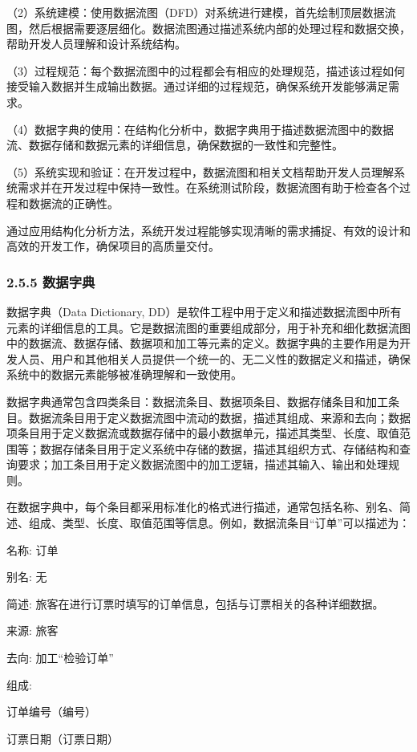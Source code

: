 （2）系统建模：使用数据流图（DFD）对系统进行建模，首先绘制顶层数据流图，然后根据需要逐层细化。数据流图通过描述系统内部的处理过程和数据交换，帮助开发人员理解和设计系统结构。

（3）过程规范：每个数据流图中的过程都会有相应的处理规范，描述该过程如何接受输入数据并生成输出数据。通过详细的过程规范，确保系统开发能够满足需求。

（4）数据字典的使用：在结构化分析中，数据字典用于描述数据流图中的数据流、数据存储和数据元素的详细信息，确保数据的一致性和完整性。

（5）系统实现和验证：在开发过程中，数据流图和相关文档帮助开发人员理解系统需求并在开发过程中保持一致性。在系统测试阶段，数据流图有助于检查各个过程和数据流的正确性。

通过应用结构化分析方法，系统开发过程能够实现清晰的需求捕捉、有效的设计和高效的开发工作，确保项目的高质量交付。

\subsubsection{2.5.5 数据字典}\label{ux6570ux636eux5b57ux5178}

数据字典（Data Dictionary, DD）是软件工程中用于定义和描述数据流图中所有元素的详细信息的工具。它是数据流图的重要组成部分，用于补充和细化数据流图中的数据流、数据存储、数据项和加工等元素的定义。数据字典的主要作用是为开发人员、用户和其他相关人员提供一个统一的、无二义性的数据定义和描述，确保系统中的数据元素能够被准确理解和一致使用。

数据字典通常包含四类条目：数据流条目、数据项条目、数据存储条目和加工条目。数据流条目用于定义数据流图中流动的数据，描述其组成、来源和去向；数据项条目用于定义数据流或数据存储中的最小数据单元，描述其类型、长度、取值范围等；数据存储条目用于定义系统中存储的数据，描述其组织方式、存储结构和查询要求；加工条目用于定义数据流图中的加工逻辑，描述其输入、输出和处理规则。

在数据字典中，每个条目都采用标准化的格式进行描述，通常包括名称、别名、简述、组成、类型、长度、取值范围等信息。例如，数据流条目``订单''可以描述为：

名称: 订单

别名: 无

简述: 旅客在进行订票时填写的订单信息，包括与订票相关的各种详细数据。

来源: 旅客

去向: 加工``检验订单''

组成:

订单编号（编号）

订票日期（订票日期）

